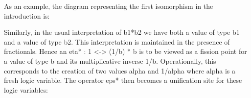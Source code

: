 \documentclass[preprint]{sigplanconf}
\begin{document}
\begin{multicols}{2}
\begin{center}
\end{center}
  
\begin{center}
\end{center}  
\end{multicols}
As an example, the diagram representing the first isomorphism in the
introduction is:
\begin{center}
\end{center}

Similarly, in the usual interpretation of {{b1*b2}} we have both a value of
type {{b1}} and a value of type {{b2}}. This interpretation is maintained in
the presence of fractionals. Hence an {{eta* : 1 <-> (1/b) * b}} is to be
viewed as a fission point for a value of type {{b}} and its multiplicative
inverse {{1/b}}. Operationally, this corresponds to the creation of two
values {{alpha}} and {{1/alpha}} where {{alpha}} is a fresh logic
variable. The operator {{eps*}} then becomes a unification site for these
logic variables:
\begin{multicols}{2}
\begin{center}
\end{center}

\begin{center}
\end{center}  
\end{multicols}
\end{document}
